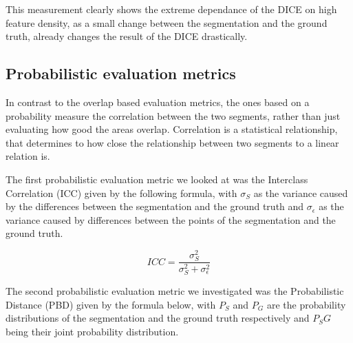 \documentclass[journal]{IEEEtran}
\begin{document}

This measurement clearly shows the extreme dependance of the DICE on high feature density, as a small change between the segmentation and the ground truth, already changes the result of the DICE drastically.

\subsection{Probabilistic evaluation metrics}

In contrast to the overlap based evaluation metrics, the ones based on a probability measure the correlation between the two segments, rather than just evaluating how good the areas overlap. Correlation is a statistical relationship, that determines to how close the relationship between two segments to a linear relation is.

\hspace{2in}

The first probabilistic evaluation metric we looked at was the Interclass Correlation (ICC) given by the following formula, with \(\sigma_S \) as the variance caused by the differences between the segmentation and the ground truth and \(\sigma_\epsilon \) as the variance caused by differences between the points of the segmentation and the ground truth.

\begin{equation} %
	ICC = \frac{\sigma_S^2}{\sigma_S^2 + \sigma_\epsilon^2}
\end{equation}

The second probabilistic evaluation metric we investigated was the Probabilistic Distance (PBD) given by the formula below, with $P_S$ and $P_G$ are the probability distributions of the segmentation and the ground truth respectively and $P_SG$ being their joint probability distribution.
\end{document}

